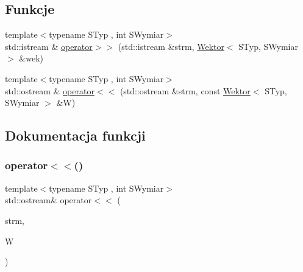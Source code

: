\subsection*{Funkcje}
\begin{DoxyCompactItemize}
\item 
{\footnotesize template$<$typename S\+Typ , int S\+Wymiar$>$ }\\std\+::istream \& \mbox{\hyperlink{wektor_8hh_a8e4012189f7f0a14281f19dbe6501d63}{operator$>$$>$}} (std\+::istream \&strm, \mbox{\hyperlink{class_wektor}{Wektor}}$<$ S\+Typ, S\+Wymiar $>$ \&wek)
\item 
{\footnotesize template$<$typename S\+Typ , int S\+Wymiar$>$ }\\std\+::ostream \& \mbox{\hyperlink{wektor_8hh_a8f87eb72cd86efdb810a423d8ddef278}{operator$<$$<$}} (std\+::ostream \&strm, const \mbox{\hyperlink{class_wektor}{Wektor}}$<$ S\+Typ, S\+Wymiar $>$ \&W)
\end{DoxyCompactItemize}


\subsection{Dokumentacja funkcji}
\mbox{\label{wektor_8hh_a8f87eb72cd86efdb810a423d8ddef278}} 
\subsubsection{\texorpdfstring{operator$<$$<$()}{operator<<()}}
{\footnotesize\ttfamily template$<$typename S\+Typ , int S\+Wymiar$>$ \\
std\+::ostream\& operator$<$$<$ (\begin{DoxyParamCaption}\item[{std\+::ostream \&}]{strm,  }\item[{const \mbox{\hyperlink{class_wektor}{Wektor}}$<$ S\+Typ, S\+Wymiar $>$ \&}]{W }\end{DoxyParamCaption})}

